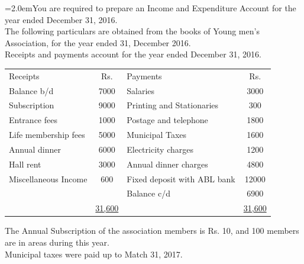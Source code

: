 \documentclass[11pt,a4paper]{article}
\newcommand{\lqn}[2]{\Needspace{6\baselineskip}\par\medskip\noindent\hangindent=2.0em\hangafter=1\makebox[2.0em][l]{\textbf{#1.}}#2\par}
\begin{document}
\lqn{19}{You are required to prepare an Income and Expenditure Account for the year ended December 31, 2016.\\
The following particulars are obtained from the books of Young men’s Association, for the year ended 31, December 2016.\\
Receipts and payments account for the year ended December 31, 2016.\par
\par\smallskip\noindent\hspace*{1.2em}\begin{tabular}{|lclc|}
\hline
Receipts & Rs. & Payments & Rs. \\
Balance b/d & 7000 & Salaries & 3000 \\
Subscription & 9000 & Printing and Stationaries & 300 \\
Entrance fees & 1000 & Postage and telephone & 1800 \\
Life membership fees & 5000 & Municipal Taxes & 1600 \\
Annual dinner & 6000 & Electricity charges & 1200 \\
Hall rent & 3000 & Annual dinner charges & 4800 \\
Miscellaneous Income & 600 & Fixed deposit with ABL bank & 12000 \\
 &  & Balance c/d & 6900 \\
 & \underline{31,600} &  & \underline{31,600} \\
\hline
\end{tabular}\par\smallskip
The Annual Subscription of the association members is Rs. 10, and 100 members are in areas during this year.\\
Municipal taxes were paid up to Match 31, 2017.\par
}
\end{document}
